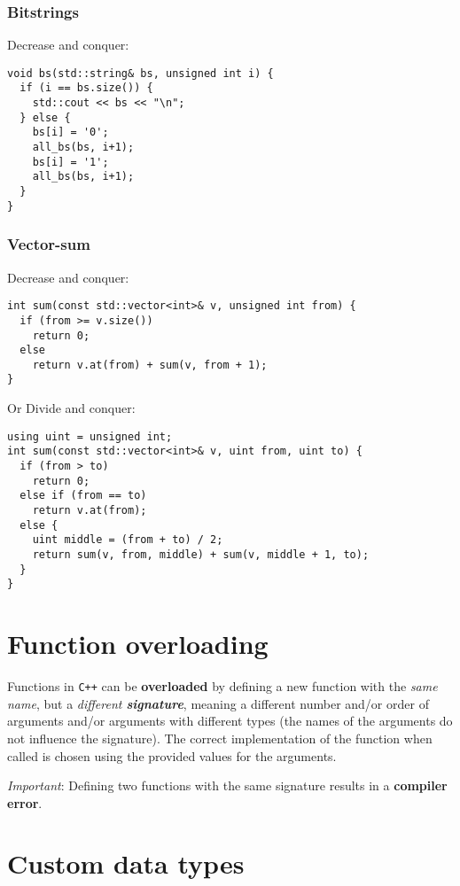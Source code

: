 \documentclass[fontsize=9pt, paper=landscape]{scrartcl}
\begin{document}
\begin{multicols}{2}
\subsubsection{Bitstrings}

Decrease and conquer:

\begin{verbatim}
void bs(std::string& bs, unsigned int i) {
  if (i == bs.size()) {
    std::cout << bs << "\n";
  } else {
    bs[i] = '0';
    all_bs(bs, i+1);
    bs[i] = '1';
    all_bs(bs, i+1);
  }
}
\end{verbatim}

\subsubsection{Vector-sum}

Decrease and conquer:

\begin{verbatim}
int sum(const std::vector<int>& v, unsigned int from) {
  if (from >= v.size())
    return 0;
  else
    return v.at(from) + sum(v, from + 1);
}
\end{verbatim}

Or Divide and conquer:

\begin{verbatim}
using uint = unsigned int;
int sum(const std::vector<int>& v, uint from, uint to) {
  if (from > to)
    return 0;
  else if (from == to)
    return v.at(from);
  else {
    uint middle = (from + to) / 2;
    return sum(v, from, middle) + sum(v, middle + 1, to);
  }
}
\end{verbatim}

\section{Function overloading}

Functions in \texttt{C++} can be \textbf{overloaded} by defining a new function with the \textit{same name}, but a \textit{different \textbf{signature}}, meaning a different number and/or order of arguments and/or arguments with different types (the names of the arguments do not influence the signature). The correct implementation of the function when called is chosen using the provided values for the arguments.

\textit{Important}: Defining two functions with the same signature results in a \textbf{compiler error}.

\section{Custom data types}


\end{multicols}
\end{document}
